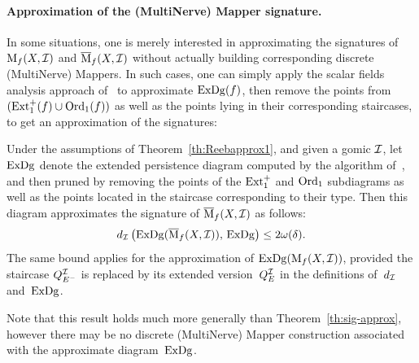 \paragraph*{Approximation of the (MultiNerve) Mapper signature.} In some situations, one is merely interested in
approximating the signatures of $\mathrm{M}_{f}(X, \mathcal{I})$ and
$\overline{\mathrm{M}}_{f}(X, \mathcal{I})$ without actually building corresponding discrete
(MultiNerve) Mappers. In such cases, one can simply apply the scalar
fields analysis approach of~\cite{Chazal09a} to approximate
$\mathrm{ExDg}(f)$, then remove the points from $(\mathrm{Ext}_1^+(f)\cup\mathrm{Ord}_1(f))$ as
well as the points lying in their corresponding staircases, to get an
approximation of the signatures:
%
\begin{thm}\label{th:sig-approx-general}
Under the assumptions of Theorem~\ref{th:Reebapprox1}, and given a gomic $\mathcal{I}$, let
$\mathrm{ExDg}$ denote the extended persistence diagram computed by the
algorithm of~\cite{Chazal09b}, and then pruned by removing the points of
the $\mathrm{Ext}_1^+$ and $\mathrm{Ord}_1$ subdiagrams as well as the points located
in the staircase corresponding to their type. Then this diagram approximates the
signature of $\overline{\mathrm{M}}_{f}(X, \mathcal{I})$ as follows: %
%
\[ 
d_{\mathcal{I}}\left(\mathrm{ExDg}(\overline{\mathrm{M}}_{f}(X, \mathcal{I})), \, \mathrm{ExDg}\right)\leq 2\omega(\delta).
\]
%
The same bound applies for the approximation of $\mathrm{ExDg}(\mathrm{M}_{f}(X,
\mathcal{I}))$, provided the staircase $Q_{E^-}^{\mathcal{I}}$ is replaced by
its extended version~$Q_{E}^{\mathcal{I}}$ in the definitions of~$d_{\mathcal{I}}$ and~$\mathrm{ExDg}$.
\end{thm}
%
Note that this result holds much more generally than
Theorem~\ref{th:sig-approx}, however there may be no discrete
(MultiNerve) Mapper construction associated with the approximate
diagram~$\mathrm{ExDg}$.





























